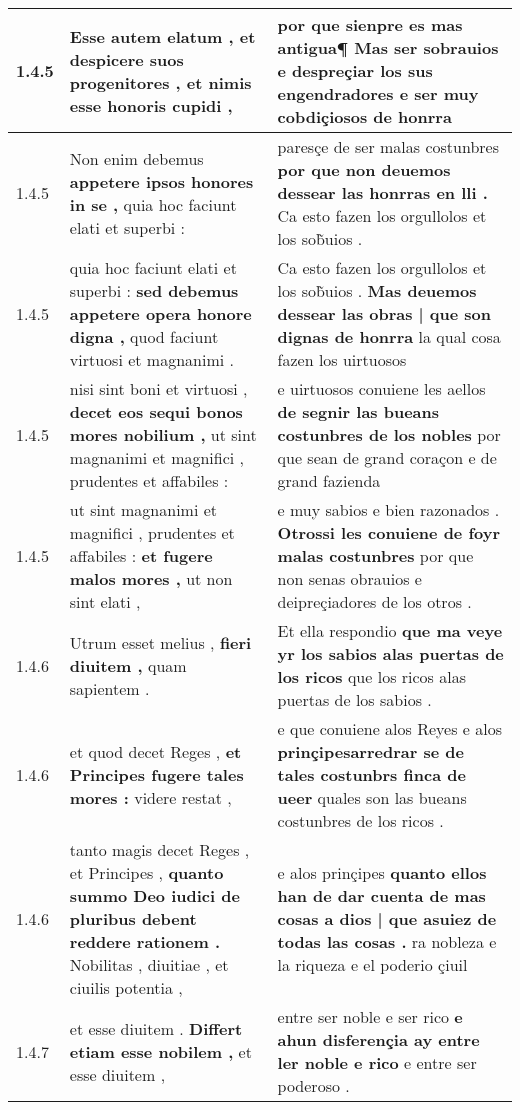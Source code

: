 \begin{tabular}{|p{1cm}|p{6.5cm}|p{6.5cm}|}
1.4.5 & Esse autem elatum , \textbf{ et despicere suos progenitores , } et nimis esse honoris cupidi , & por que sienpre es mas antigua¶ \textbf{ Mas ser sobrauios e despreçiar los sus engendradores } e ser muy cobdiçiosos de honrra \\\hline
1.4.5 & Non enim debemus \textbf{ appetere ipsos honores in se , } quia hoc faciunt elati et superbi : & paresçe de ser malas costunbres \textbf{ por que non deuemos dessear las honrras en lli . } Ca esto fazen los orgullolos et los sob̃uios . \\\hline
1.4.5 & quia hoc faciunt elati et superbi : \textbf{ sed debemus appetere opera honore digna , } quod faciunt virtuosi et magnanimi . & Ca esto fazen los orgullolos et los sob̃uios . \textbf{ Mas deuemos dessear las obras | que son dignas de honrra } la qual cosa fazen los uirtuosos \\\hline
1.4.5 & nisi sint boni et virtuosi , \textbf{ decet eos sequi bonos mores nobilium , } ut sint magnanimi et magnifici , prudentes et affabiles : & e uirtuosos conuiene les aellos \textbf{ de segnir las bueans costunbres de los nobles } por que sean de grand coraçon e de grand fazienda \\\hline
1.4.5 & ut sint magnanimi et magnifici , prudentes et affabiles : \textbf{ et fugere malos mores , } ut non sint elati , & e muy sabios e bien razonados . \textbf{ Otrossi les conuiene de foyr malas costunbres } por que non senas obrauios e deipreçiadores de los otros . \\\hline
1.4.6 & Utrum esset melius , \textbf{ fieri diuitem , } quam sapientem . & Et ella respondio \textbf{ que ma veye yr los sabios alas puertas de los ricos } que los ricos alas puertas de los sabios . \\\hline
1.4.6 & et quod decet Reges , \textbf{ et Principes fugere tales mores : } videre restat , & e que conuiene alos Reyes e alos \textbf{ prinçipesarredrar se de tales costunbrs finca de ueer } quales son las bueans costunbres de los ricos . \\\hline
1.4.6 & tanto magis decet Reges , et Principes , \textbf{ quanto summo Deo iudici de pluribus debent reddere rationem . } Nobilitas , diuitiae , et ciuilis potentia , & e alos prinçipes \textbf{ quanto ellos han de dar cuenta de mas cosas a dios | que asuiez de todas las cosas . } ra nobleza e la riqueza e el poderio çiuil \\\hline
1.4.7 & et esse diuitem . \textbf{ Differt etiam esse nobilem , } et esse diuitem , & entre ser noble e ser rico \textbf{ e ahun disferençia ay entre ler noble e rico } e entre ser poderoso . \\\hline

\end{tabular}
